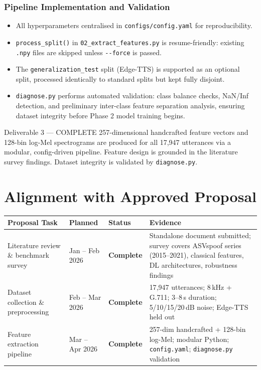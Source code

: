 \documentclass[12pt,a4paper]{report}
\newcommand{\statuscomplete}{\colorbox{statusgreen}{\color{white}\textbf{\small Complete}}}
\begin{document}
\subsection{Pipeline Implementation and Validation}

\begin{itemize}
  \item All hyperparameters centralised in \texttt{configs/config.yaml} for reproducibility.
  \item \texttt{process\_split()} in \texttt{02\_extract\_features.py} is resume-friendly:
    existing \texttt{.npy} files are skipped unless \texttt{-{}-force} is passed.
  \item The \texttt{generalization\_test} split (Edge-TTS) is supported as an optional
    split, processed identically to standard splits but kept fully disjoint.
  \item \texttt{diagnose.py} performs automated validation: class balance checks,
    NaN/Inf detection, and preliminary inter-class feature separation analysis, ensuring
    dataset integrity before Phase 2 model training begins.
\end{itemize}

\begin{deliverablebox}{Deliverable 3 --- COMPLETE}
  257-dimensional handcrafted feature vectors and 128-bin log-Mel spectrograms are
  produced for all 17{,}947 utterances via a modular, config-driven pipeline. Feature
  design is grounded in the literature survey findings. Dataset integrity is validated
  by \texttt{diagnose.py}.
\end{deliverablebox}

\chapter{Alignment with Approved Proposal}

\begin{center}
\begin{tabular}{L{3.5cm}C{2cm}C{1.8cm}L{5.7cm}}
  \toprule
  \color{white}\textbf{Proposal Task} &
  \color{white}\textbf{Planned} &
  \color{white}\textbf{Status} &
  \color{white}\textbf{Evidence} \\
  \midrule
  Literature review \& benchmark survey &
  Jan -- Feb 2026 & \statuscomplete &
  Standalone document submitted; survey covers ASVspoof series (2015--2021),
  classical features, DL architectures, robustness findings \\[4pt]
  Dataset collection \& preprocessing &
  Feb -- Mar 2026 & \statuscomplete &
  17{,}947 utterances; 8\,kHz + G.711; 3--8\,s duration; 5/10/15/20\,dB noise;
  Edge-TTS held out \\[4pt]
  Feature extraction pipeline &
  Mar -- Apr 2026 & \statuscomplete &
  257-dim handcrafted + 128-bin log-Mel; modular Python; \texttt{config.yaml};
  \texttt{diagnose.py} validation \\
  \bottomrule
\end{tabular}
\end{center}
\end{document}
